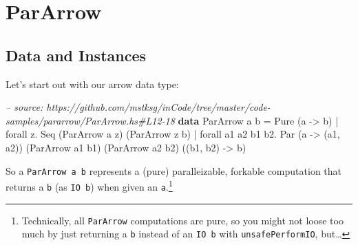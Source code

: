 \documentclass[]{article}
\newenvironment{Shaded}{}{}
\newcommand{\KeywordTok}[1]{\textcolor[rgb]{0.00,0.44,0.13}{\textbf{#1}}}
\newcommand{\DataTypeTok}[1]{\textcolor[rgb]{0.56,0.13,0.00}{#1}}
\newcommand{\CommentTok}[1]{\textcolor[rgb]{0.38,0.63,0.69}{\textit{#1}}}
\newcommand{\OtherTok}[1]{\textcolor[rgb]{0.00,0.44,0.13}{#1}}
\newcommand{\FunctionTok}[1]{\textcolor[rgb]{0.02,0.16,0.49}{#1}}
\newcommand{\NormalTok}[1]{#1}
\begin{document}
\section{ParArrow}\label{pararrow}

\subsection{Data and Instances}\label{data-and-instances}

Let's start out with our arrow data type:

\begin{Shaded}
\begin{Highlighting}[]
\CommentTok{-- source: https://github.com/mstksg/inCode/tree/master/code-samples/pararrow/ParArrow.hs#L12-18}
\KeywordTok{data} \DataTypeTok{ParArrow}\NormalTok{ a b }\FunctionTok{=}                     \DataTypeTok{Pure}\NormalTok{  (a }\OtherTok{->}\NormalTok{ b)}
                  \FunctionTok{|}\NormalTok{ forall z}\FunctionTok{.}           \DataTypeTok{Seq}\NormalTok{   (}\DataTypeTok{ParArrow}\NormalTok{ a z)}
\NormalTok{                                              (}\DataTypeTok{ParArrow}\NormalTok{ z b)}
                  \FunctionTok{|}\NormalTok{ forall a1 a2 b1 b2}\FunctionTok{.} \DataTypeTok{Par}\NormalTok{   (a }\OtherTok{->}\NormalTok{ (a1, a2))}
\NormalTok{                                              (}\DataTypeTok{ParArrow}\NormalTok{ a1 b1)}
\NormalTok{                                              (}\DataTypeTok{ParArrow}\NormalTok{ a2 b2)}
\NormalTok{                                              ((b1, b2) }\OtherTok{->}\NormalTok{ b)}
\end{Highlighting}
\end{Shaded}

So a \texttt{ParArrow\ a\ b} represents a (pure) paralleizable, forkable
computation that returns a \texttt{b} (as \texttt{IO\ b}) when given an
\texttt{a}.\footnote{Technically, all \texttt{ParArrow} computations are pure,
  so you might not loose too much by just returning a \texttt{b} instead of an
  \texttt{IO\ b} with \texttt{unsafePerformIO}, but\ldots{}}
\end{document}
